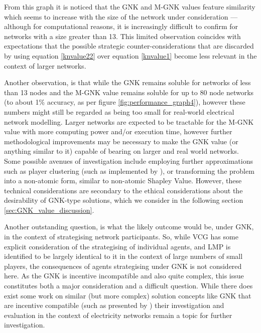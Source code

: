 From this graph it is noticed that the GNK and M-GNK values feature similarity which seems to increase with the size of the network under consideration --- although for computational reasons, it is increasingly difficult to confirm for networks with a size greater than 13.
This limited observation coincides with expectations that the possible strategic counter-considerations that are discarded by using equation \ref{knvalue22} over equation \ref{knvalue1} become less relevant in the context of larger networks.

Another observation, is that while the GNK remains soluble for networks of less than 13 nodes and the M-GNK value remains soluble for up to 80 node networks (to about 1\% accuracy, as per figure \ref{fig:performance_graph4}), however these numbers might still be regarded as being too small for real-world electrical network modelling.
Larger networks are expected to be tractable for the M-GNK value with more computing power and/or execution time, however further methodological improvements may be necessary to make the GNK value (or anything similar to it) capable of bearing on larger and real world networks.
Some possible avenues of investigation include employing further approximations such as player clustering (such as implemented by \cite{DBLP:journals/corr/abs-1903-10965}), or transforming the problem into a non-atomic form, similar to non-atomic Shapley Value.
However, these technical considerations are secondary to the ethical considerations about the desirability of GNK-type solutions, which we consider in the following section \ref{sec:GNK_value_discussion}.

Another outstanding question, is what the likely outcome would be, under GNK, in the context of strategising network participants.
So, while VCG has some explicit consideration of the strategising of individual agents, and LMP is identified to be largely identical to it in the context of large numbers of small players, the consequences of agents strategising under GNK is not considered here.
As the GNK is incentive incompatible and also quite complex, this issue constitutes both a major consideration and a difficult question.
While there does exist some work on similar (but more complex) solution concepts like GNK that are incentive compatible (such as presented by \cite{myerson1,Salamanca2019}) their investigation and evaluation in the context of electricity networks remain a topic for further investigation.




